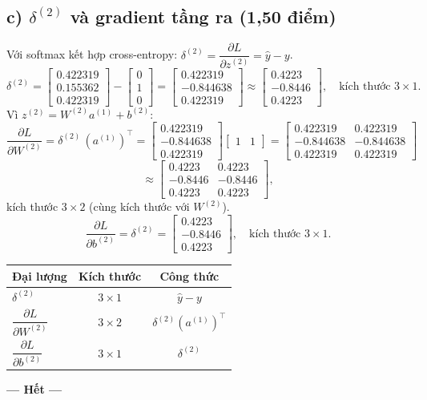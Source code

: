 \documentclass[12pt,a4paper]{article}
\newcommand{\pd}[2]{\dfrac{\partial #1}{\partial #2}}
\begin{document}
\subsection*{c) $\delta^{(2)}$ và gradient tầng ra (1,50 điểm)}

Với softmax kết hợp cross-entropy: $\delta^{(2)}=\pd{L}{z^{(2)}}=\hat y-y$.
\[
\delta^{(2)}=\begin{bmatrix}0.422319\\0.155362\\0.422319\end{bmatrix}-\begin{bmatrix}0\\1\\0\end{bmatrix}
=\boxed{\begin{bmatrix}0.422319\\-0.844638\\0.422319\end{bmatrix}}\approx\begin{bmatrix}0.4223\\-0.8446\\0.4223\end{bmatrix},
\quad\text{kích thước }3\times1.
\]
Vì $z^{(2)}=W^{(2)}a^{(1)}+b^{(2)}$:
\[
\pd{L}{W^{(2)}}=\delta^{(2)}\,(a^{(1)})^{\top}
=\begin{bmatrix}0.422319\\-0.844638\\0.422319\end{bmatrix}\begin{bmatrix}1&1\end{bmatrix}
=\boxed{\begin{bmatrix}0.422319&0.422319\\-0.844638&-0.844638\\0.422319&0.422319\end{bmatrix}}
\]
\[
\approx\begin{bmatrix}0.4223&0.4223\\-0.8446&-0.8446\\0.4223&0.4223\end{bmatrix},
\]
kích thước $3\times2$ (cùng kích thước với $W^{(2)}$).
\[
\pd{L}{b^{(2)}}=\delta^{(2)}=\boxed{\begin{bmatrix}0.4223\\-0.8446\\0.4223\end{bmatrix}},\quad\text{kích thước }3\times1.
\]

\begin{center}
\begin{tabular}{@{}lcc@{}}
\toprule
Đại lượng & Kích thước & Công thức \\
\midrule
$\delta^{(2)}$ & $3\times1$ & $\hat y-y$ \\
$\pd{L}{W^{(2)}}$ & $3\times2$ & $\delta^{(2)}(a^{(1)})^{\top}$ \\
$\pd{L}{b^{(2)}}$ & $3\times1$ & $\delta^{(2)}$ \\
\bottomrule
\end{tabular}
\end{center}

\begin{center}\textbf{--- Hết ---}\end{center}
\end{document}
